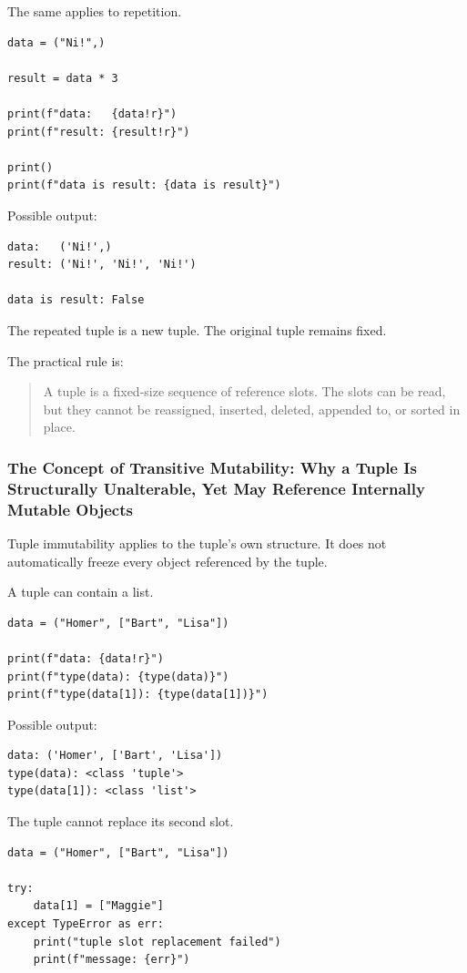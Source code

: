 The same applies to repetition.

\begin{verbatim}
data = ("Ni!",)

result = data * 3

print(f"data:   {data!r}")
print(f"result: {result!r}")

print()
print(f"data is result: {data is result}")
\end{verbatim}

Possible output:

\begin{verbatim}
data:   ('Ni!',)
result: ('Ni!', 'Ni!', 'Ni!')

data is result: False
\end{verbatim}

The repeated tuple is a new tuple. The original tuple remains fixed.

The practical rule is:

\begin{quote}
A tuple is a fixed-size sequence of reference slots. The slots can be read, but they cannot be reassigned, inserted, deleted, appended to, or sorted in place.
\end{quote}

\subsubsection{The Concept of Transitive Mutability: Why a Tuple Is Structurally Unalterable, Yet May Reference Internally Mutable Objects}

Tuple immutability applies to the tuple's own structure. It does not automatically freeze every object referenced by the tuple.

A tuple can contain a list.

\begin{verbatim}
data = ("Homer", ["Bart", "Lisa"])

print(f"data: {data!r}")
print(f"type(data): {type(data)}")
print(f"type(data[1]): {type(data[1])}")
\end{verbatim}

Possible output:

\begin{verbatim}
data: ('Homer', ['Bart', 'Lisa'])
type(data): <class 'tuple'>
type(data[1]): <class 'list'>
\end{verbatim}

The tuple cannot replace its second slot.

\begin{verbatim}
data = ("Homer", ["Bart", "Lisa"])

try:
    data[1] = ["Maggie"]
except TypeError as err:
    print("tuple slot replacement failed")
    print(f"message: {err}")
\end{verbatim}

